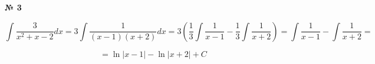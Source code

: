 \documentclass{article}
\begin{document}
\textbf{№ 3} 

$$ \int \frac{3}{x^2+x-2} dx 
= 3\int \frac{1}{(x-1)(x+2)} dx 
= 3 \left( \frac{1}{3} \int \frac{1}{x-1} - \frac{1}{3} \int \frac{1}{x+2} \right) 
= \int \frac{1}{x-1} - \int \frac{1}{x+2} 
= $$

$$ = \ln{\left| x-1 \right|} - \ln{\left| x+2 \right|} + C $$
\end{document}
